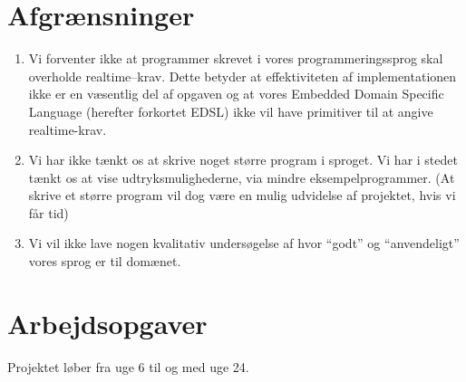 \documentclass[a4paper,oneside, draft]{memoir}
\newcommand{\EDSL}{Embedded Domain Specific Language (herefter forkortet
  EDSL) \renewcommand{\EDSL}{ EDSL }}
\begin{document}
\section{Afgrænsninger}
\begin{enumerate}

\item Vi forventer ikke at programmer skrevet i vores programmeringssprog skal
  overholde realtime--krav. Dette betyder at effektiviteten af implementationen
  ikke er en væsentlig del af opgaven og at vores \EDSL ikke vil have primitiver
  til at angive realtime-krav.

\item Vi har ikke tænkt os at skrive noget større program i sproget. Vi har i
  stedet tænkt os at vise udtryksmulighederne, via mindre
  eksempelprogrammer. (At skrive et større program vil dog være en mulig
  udvidelse af projektet, hvis vi får tid)

\item Vi vil ikke lave nogen kvalitativ undersøgelse af hvor "`godt"' og
  "`anvendeligt"' vores sprog er til domænet.

\end{enumerate}

\section{Arbejdsopgaver}
Projektet løber fra uge 6 til og med uge 24.
\end{document}
